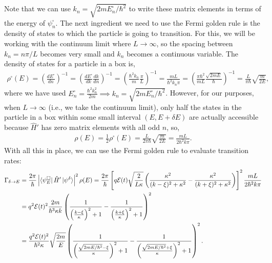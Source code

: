 \documentclass[10pt]{article}
\newcommand{\1}{\mathbf 1}
\begin{document}
Note that we can use $k_n = \sqrt{2m E_n^\square / \hbar^2}$ to write these matrix elements in terms of the energy of $\psi_n^\square$.
The next ingredient we need to use the Fermi golden rule is the density of states to which the particle is going to transition.
For this, we will be working with the continuum limit where $L \to \infty$, so the spacing between $k_n = n\pi/L$ becomes very small and $k_n$ becomes a continuous variable.
The density of states for a particle in a box is,
\begin{align}
	\rho^\square(E)
	=
	\left(\frac{d E^\square}{dn}\right)^{-1}
	=
	\left(\frac{d E^\square}{dk}
	\frac{dk}{dn}\right)^{-1}
	=
	\left(
		\frac{\hbar^2 k_n}{m}
		\frac{\pi}{L}
	\right)^{-1}
	=
	\frac{m L}{\hbar^2 k_n \pi}
	=
	\left(
		\frac{\pi\hbar^2}{mL}\frac{\sqrt{2m E}}{\hbar}
	\right)^{-1}
	=
	\frac{L}{\pi \hbar}\sqrt{\frac{m}{2 E}}
	,
\end{align}
where we have used $E_n^\square = \frac{\hbar^2 k_n^2}{2m} \implies k_n = \sqrt{2m E_n^\square/\hbar^2}$.
However, for our purposes, when $L \to \infty$ (i.e., we take the continuum limit), only half the states in the particle in a box within some small interval $(E, E+\delta E)$ are actually accessible because $\hat H'$ has zero matrix elements with all odd $n$, so,
\begin{align}
	\rho(E)
	=
	\frac{1}{2}\rho^\square (E)
	=
	\frac{L}{2\pi\hbar}
	\sqrt{\frac{m}{2E}}
	=
	\frac{m L}{2\hbar^2 k \pi}
	.
\end{align}
With all this in place, we can use the Fermi golden rule to evaluate transition rates:
\begin{align}
	\Gamma_{\delta \to E}
	&=\nonumber
	\frac{2\pi}{\hbar}
	\left|
		\bra{\psi_E^\square} \hat H' \ket{\psi^\delta}
	\right|^2
	\rho(E)
	=
	\frac{2\pi}{\hbar}
	\left[
		q \mathcal{E}(t)
		\sqrt{\frac{2}{L\kappa}}
		\left(
			\frac{\kappa^2}{(k - \xi)^2 + \kappa^2}
			-
			\frac{\kappa^2}{(k + \xi)^2 + \kappa^2}
		\right)
	\right]^2
	\frac{m L}{2 \hbar^2 k \pi}
	\\
	&=
	q^2 \mathcal{E}(t)^2
	\frac{2m}{\hbar^3 \kappa k }
		\left(
			\frac{1}{\left(\frac{k - \xi}{\kappa}\right)^2 + 1}
			-
			\frac{1}{\left(\frac{k + \xi}{\kappa}\right)^2 + 1}
		\right)^2
		\\
	&=
	\frac{q^2 \mathcal{E}(t)^2}{\hbar^2 \kappa }
	\sqrt{\frac{2m}{E}}
		\left(
			\frac{1}{\left(\frac{\sqrt{2m E/\hbar^2} - \xi}{\kappa}\right)^2 + 1}
			-
			\frac{1}{\left(\frac{\sqrt{2m E/\hbar^2} + \xi}{\kappa}\right)^2 + 1}
		\right)^2.
\end{align}
\end{document}
